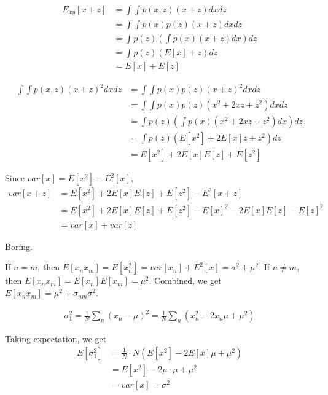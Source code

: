 \begin{problem}
  \begin{align*}
    E_{xy}\left[x + z\right] &= \int \int p(x, z) (x + z) dx dz \\
                &= \int \int p(x)p(z) (x + z) dx dz \\
                &= \int p(z) \left( \int p(x) (x + z) dx \right) dz \\
                &= \int p(z) \left( E[x] + z \right) dz \\
                &= E[x]+ E[z]
  \end{align*}

  \begin{align*}
    \int \int p(x, z) (x + z)^2 dx dz
                &= \int \int p(x) p(z) (x + z)^2 dx dz \\
                &= \int \int p(x) p(z) (x^2 + 2 x z + z^2) dx dz \\
                &= \int p(z) \left( \int p(x) (x^2 + 2 x z + z^2) dx \right) dz \\
                &= \int p(z) \left( E[x^2] + 2 E[x] z + z^2 \right) dz \\
                &= E[x^2] + 2 E[x] E[z] + E[z^2]
  \end{align*}

  Since $var[x] = E[x^2] - E^2[x]$,
  \begin{align*}
    var[x + z] &= E[x^2] + 2 E[x] E[z] + E[z^2] - E^2[x + z] \\
                &= E[x^2] + 2 E[x] E[z] + E[z^2] - E[x]^2 - 2 E[x] E[z] - E[z]^2 \\
                &= var[x] + var[z]
  \end{align*}
\end{problem}

\begin{problem}
  Boring.
\end{problem}

\begin{problem}
  If $n=m$, then $E[x_n x_m] = E[x_n^2] = var[x_n] + E^2[x] = \sigma^2 + \mu^2$.
  If $n\neq m$, then $E[x_n x_m] = E[x_n] E[x_m] = \mu^2$.
  Combined, we get $E[x_n x_m] = \mu^2 + \sigma_{nm} \sigma^2$.
\end{problem}

\begin{problem}
  \begin{align*}
    \sigma_1^2 = \frac{1}{N} \sum_n (x_n - \mu)^2 =
      \frac{1}{N} \sum_n (x_n^2 - 2 x_n \mu + \mu^2)
  \end{align*}

  Taking expectation, we get
  \begin{align*}
    E[\sigma_1^2] &= \frac{1}{N} \cdot N (E[x^2] - 2 E[x] \mu + \mu^2) \\
                  &= E[x^2] - 2 \mu \cdot \mu + \mu^2 \\
                  &= var[x] = \sigma^2
  \end{align*}
\end{problem}